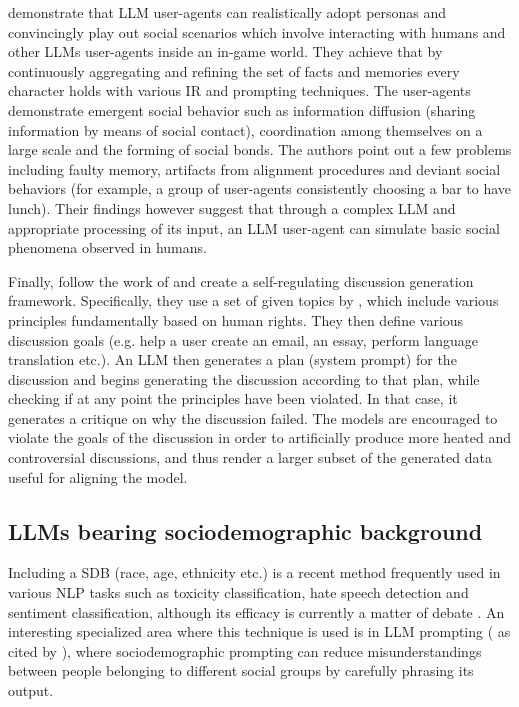 \citet{Park2023GenerativeAI} demonstrate that LLM user-agents can realistically adopt personas and convincingly play out social scenarios which involve interacting with humans and other LLMs user-agents inside an in-game world. They achieve that by continuously aggregating and refining the set of facts and memories every character holds with various \ac{IR} and prompting techniques. The user-agents demonstrate emergent social behavior such as information diffusion (sharing information by means of social contact), coordination among themselves on a large scale and the forming of social bonds. The authors point out a few problems including faulty memory, artifacts from alignment procedures and deviant social behaviors (for example, a group of user-agents consistently choosing a bar to have lunch). Their findings however suggest that through a complex LLM and appropriate processing of its input, an LLM user-agent can simulate basic social phenomena observed in humans.


Finally, \citet{lambert2024selfdirectedsyntheticdialoguesrevisions} follow the work of \citet{Bai2022ConstitutionalAH} and create a self-regulating discussion generation framework. Specifically, they use a set of given topics by \citet{Castricato2024SuppressingPE}, which include various principles fundamentally based on human rights. They then define various discussion goals (e.g. help a user create an email, an essay, perform language translation etc.). An LLM then generates a plan (system prompt) for the discussion and begins generating the discussion according to that plan, while checking if at any point the principles have been violated. In that case, it generates a critique on why the discussion failed. The models are encouraged to violate the goals of the discussion in order to artificially produce more heated and controversial discussions, and thus render a larger subset of the generated data useful for aligning the model.

\subsection{LLMs bearing sociodemographic background}
\label{sec:related:sociodemographic}

Including a \ac{SDB} (race, age, ethnicity etc.) is a recent method frequently used in various \ac{NLP} tasks such as toxicity classification, hate speech detection and sentiment classification, although its efficacy is currently a matter of debate \cite{beck-etal-2024-sensitivity}. An interesting specialized area where this technique is used is in LLM prompting (\cite{hwang-etal-2023-aligning, durmus2024measuringrepresentationsubjectiveglobal} as cited by \citet{beck-etal-2024-sensitivity}), where sociodemographic prompting can reduce misunderstandings between people belonging to different social groups by carefully phrasing its output. 

